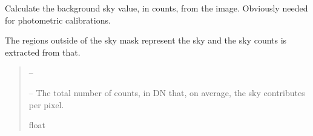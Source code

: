 \documentclass[letterpaper,11pt,english]{sphinxmanual}
\begin{document}
\begin{savenotes}
\begin{fulllineitems}
\begin{savenotes}
\begin{fulllineitems}
\end{fulllineitems}\end{savenotes}


\begin{savenotes}\begin{fulllineitems}
\label{\detokenize{code/opihiexarata.photometry.solution:opihiexarata.photometry.solution.PhotometricSolution.__calculate_sky_counts_value}}
\pysigstartsignatures
{}
\pysigstopsignatures
\sphinxAtStartPar
Calculate the background sky value, in counts, from the image.
Obviously needed for photometric calibrations.

\sphinxAtStartPar
The regions outside of the sky mask represent the sky and the sky
counts is extracted from that.
\begin{quote}\begin{description}
\sphinxAtStartPar
{} – 

\sphinxAtStartPar
{} – The total number of counts, in DN that, on average, the sky
contributes per pixel.

\sphinxAtStartPar
float

\end{description}\end{quote}

\end{fulllineitems}\end{savenotes}



\end{fulllineitems}
\end{savenotes}
\end{document}

